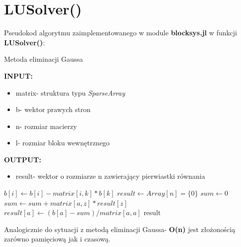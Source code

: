 \documentclass[a4paper,14pt]{report}
\begin{document}
  \section{LUSolver()}
  Pseudokod algorytmu zaimplementowanego w module \textbf{blocksys.jl} w funkcji \textbf{LUSolver()}:
  \begin{algorithm}[H]
    \caption{Metoda eliminacji Gaussa}
    \textbf{INPUT:}
    \begin{itemize}
      \item matrix- struktura typu \textit{SparseArray}
      \item b- wektor prawych stron 
      \item n- rozmiar macierzy
      \item l- rozmiar bloku wewnętrznego
    \end{itemize}
    \textbf{OUTPUT:}
    \begin{itemize}
      \item result- wektor o rozmiarze n zawierający pierwiastki równania
    \end{itemize}
    \begin{algorithmic} 
          \STATE $b[i] \leftarrow b[i]-matrix[i,k]*b[k]$
        \ENDFOR
        \STATE $result \leftarrow Array[n]=\{0\}$
          \STATE $sum \leftarrow 0$
            \STATE $sum \leftarrow sum+matrix[a,z]*result[z]$
          \ENDFOR
          \STATE $result[a] \leftarrow (b[a]-sum)/matrix[a,a]$
        \ENDFOR
      \ENDFOR
      \RETURN result
      \end{algorithmic}
  \end{algorithm}

  Analogicznie do sytuacji z metodą eliminacji Gaussa- \textbf{O(n)} jest złożonością zarówno pamięciową jak i czasową.
\end{document}
